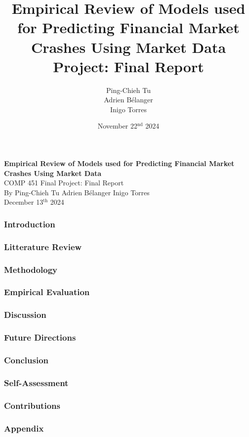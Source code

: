 \documentclass[12pt, letterpaper]{article}
\title{Empirical Review of Models used for Predicting Financial Market Crashes Using Market Data \\[1em] \large Project: Final Report}
\author{\normalsize Ping-Chieh Tu \\ Adrien Bélanger \\ Inigo Torres}
\date{\vspace{2em} November 22$^{\text{nd}}$ 2024}
\begin{document}
\begin{titlepage}
    \centering
    \vspace*{2in}
    {\LARGE \textbf{Empirical Review of Models used for Predicting Financial Market Crashes Using Market Data}}\\
    \vspace*{0.5in}
    {\large COMP 451 Final Project: Final Report}\\[4in]
    \normalsize
    By Ping-Chieh Tu  
    Adrien Bélanger Inigo Torres \\ [3em]
    December 13$^{\text{th}}$ 2024
\end{titlepage}
\pagebreak

\subsubsection*{Introduction}

\subsubsection*{Litterature Review}

\subsubsection*{Methodology}

\subsubsection*{Empirical Evaluation}

\subsubsection*{Discussion}

\subsubsection*{Future Directions}

\subsubsection*{Conclusion}

\subsubsection*{Self-Assessment}

\subsubsection*{Contributions}

\subsubsection*{Appendix}




\pagebreak
\cite{Ahmed} %
\printbibliography
\end{document}
